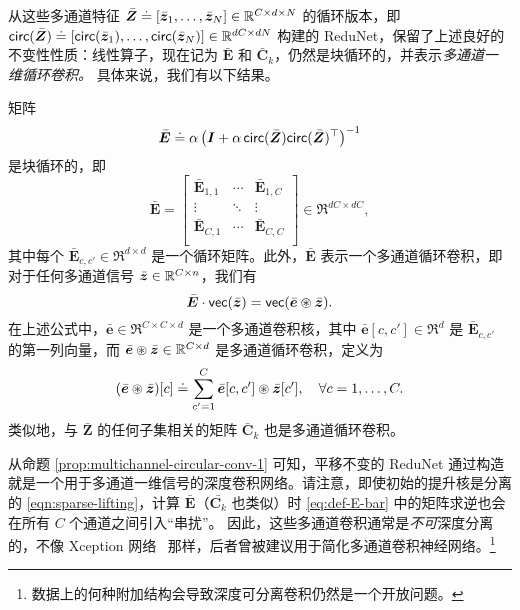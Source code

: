 \documentclass[../../book-main_zh.tex]{subfiles}
\begin{document}
从这些多通道特征 $\bar{\bm{Z}} \doteq [\bar {\bm{z}}_1, \ldots, \bar {\bm{z}}_N] \in \mathbb{R}^{C \times d \times N}$ 的循环版本，即 $\mathsf{circ}(\bar{\bm{Z}}) \doteq [ \mathsf{circ}(\bar{\bm{z}}_1), \dots, \mathsf{circ}(\bar{\bm{z}}_N)] \in \mathbb{R}^{dC \times dN}$ 构建的 ReduNet，保留了上述良好的不变性性质：线性算子，现在记为 $\bar{\bm E}$ 和 $\bar{\bm C}_k$，仍然是块循环的，并表示{\em 多通道一维循环卷积。}
具体来说，我们有以下结果。
\begin{proposition}
矩阵
\begin{equation}
\label{eq:def-E-bar}
\bar{\bm E} \doteq \alpha\left(\bm I + \alpha\, \mathsf{circ}(\bar{\bm{Z}}) \mathsf{circ}(\bar{\bm{Z}})^\top \right) ^{-1}
\end{equation}
是块循环的，即
\begin{equation*}
    \bar{\bm E} =
    \left[\begin{matrix}
        \bar{\bm E}_{1, 1} & \cdots & \bar{\bm E}_{1, C}\\
        \vdots & \ddots & \vdots \\
        \bar{\bm E}_{C, 1} & \cdots & \bar{\bm E}_{C, C}\\
    \end{matrix}\right] \in \Re^{dC \times dC},
\end{equation*}
其中每个 $\bar{\bm E}_{c, c'}\in \Re^{d \times d}$ 是一个循环矩阵。此外，$\bar{\bm E}$ 表示一个多通道循环卷积，即对于任何多通道信号 $\bar{\bm{z}} \in \mathbb{R}^{C \times n}$，我们有
$$\bar{\bm E} \cdot \textsf{vec}(\bar{\bm{z}}) = \textsf{vec}( \bar{\bm e} \circledast \bar{\bm{z}}).$$
在上述公式中，$\bar{\bm e} \in \Re^{C \times C \times d}$ 是一个多通道卷积核，其中 $\bar{\bm e}[c, c'] \in \Re^{d}$ 是 $\bar{\bm E}_{c, c'}$ 的第一列向量，而 $\bar{\bm e} \circledast \bar{\bm{z}} \in \mathbb{R}^{C \times d}$ 是多通道循环卷积，定义为
\begin{equation*}
    (\bar{\bm e} \circledast \bar{\bm{z}})[c] \doteq \sum_{c'=1}^C \bar{\bm e}[c, c'] \circledast \bar{\bm{z}}[c'], \quad \forall c = 1, \ldots, C.
\end{equation*}
类似地，与 $\bar{\bm Z}$ 的任何子集相关的矩阵 $\bar{\bm C}_k$ 也是多通道循环卷积。
\label{prop:multichannel-circular-conv-1}
\end{proposition}
从命题 \ref{prop:multichannel-circular-conv-1} 可知，平移不变的 ReduNet 通过构造就是一个用于多通道一维信号的深度卷积网络。请注意，即使初始的提升核是分离的 \eqref{eqn:sparse-lifting}，计算 $\bar{\bm E}$（$\bar{\bm C_k}$ 也类似）时 \eqref{eq:def-E-bar} 中的矩阵求逆也会在所有 $C$ 个通道之间引入“串扰”。%
因此，这些多通道卷积通常是{\em 不可}深度分离的，不像 Xception 网络~\cite{Xception} 那样，后者曾被建议用于简化多通道卷积神经网络。\footnote{数据上的何种附加结构会导致深度可分离卷积仍然是一个开放问题。}
\end{document}
